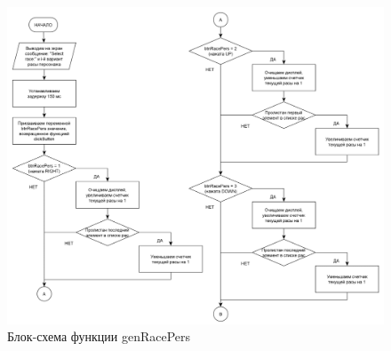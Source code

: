 \documentclass{altsu-report}
\begin{document}
\begin{figure}[H]
    \centering
    \includegraphics[scale=0.8]{genRacePers1.png}
    \caption{Блок-схема функции genRacePers}
    \label{fig:race1}
\end{figure}
\end{document}
